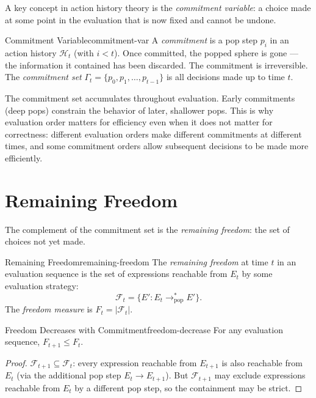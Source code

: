 A key concept in action history theory is the \emph{commitment variable}:
a choice made at some point in the evaluation that is now fixed and
cannot be undone.

\begin{definition}{Commitment Variable}{commitment-var}
  A \emph{commitment} is a pop step $p_i$ in an action history
  $\mathcal{H}_t$ (with $i < t$). Once committed, the popped sphere
  is gone — the information it contained has been discarded. The
  commitment is irreversible.
  The \emph{commitment set} $\Gamma_t = \{p_0, p_1, \ldots, p_{t-1}\}$
  is all decisions made up to time $t$.
\end{definition}

The commitment set accumulates throughout evaluation. Early commitments
(deep pops) constrain the behavior of later, shallower pops. This
is why evaluation order matters for efficiency even when it does not
matter for correctness: different evaluation orders make different
commitments at different times, and some commitment orders allow
subsequent decisions to be made more efficiently.

\section{Remaining Freedom}

The complement of the commitment set is the \emph{remaining freedom}:
the set of choices not yet made.

\begin{definition}{Remaining Freedom}{remaining-freedom}
  The \emph{remaining freedom} at time $t$ in an evaluation sequence
  is the set of expressions reachable from $E_t$ by some evaluation
  strategy:
  \[
    \mathcal{F}_t = \{E' : E_t \to_\text{pop}^* E'\}.
  \]
  The \emph{freedom measure} is $F_t = |\mathcal{F}_t|$.
\end{definition}

\begin{proposition}{Freedom Decreases with Commitment}{freedom-decrease}
  For any evaluation sequence, $F_{t+1} \leq F_t$.
\end{proposition}

\begin{proof}
  $\mathcal{F}_{t+1} \subseteq \mathcal{F}_t$: every expression reachable
  from $E_{t+1}$ is also reachable from $E_t$ (via the additional pop
  step $E_t \to E_{t+1}$). But $\mathcal{F}_{t+1}$ may exclude expressions
  reachable from $E_t$ by a different pop step, so the containment
  may be strict.
\end{proof}

